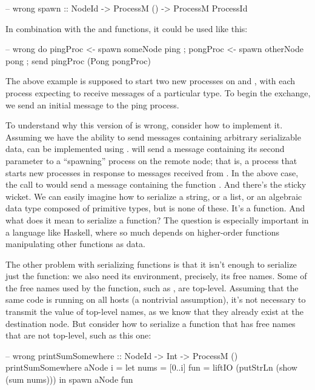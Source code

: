 \documentclass[preprint]{sigplanconf}
\begin{document}
\begin{code}
-- wrong
spawn :: NodeId -> ProcessM () -> ProcessM ProcessId
\end{code}

In combination with the  and  functions, it could be used like this:

\begin{code}
-- wrong
do { pingProc <- spawn someNode ping
   ; pongProc <- spawn otherNode pong
   ; send pingProc (Pong pongProc) }
\end{code}

The above example is supposed to start two new processes on  and , with each process expecting to receive messages of a particular type. To begin the exchange, we send an initial message to the ping process.

To understand why this version of  is wrong, consider how to implement it. Assuming we have the ability to send messages containing arbitrary serializable data,  can be implemented using .   will send a message containing its second parameter to a ``spawning'' process on the remote node; that is, a process that starts new processes in response to messages received from . In the above case, the call to  would send a message containing the function . And there's the sticky wicket. We can easily imagine how to serialize a string, or a list, or an algebraic data type composed of primitive types, but  is none of these. It's a function. And what does it mean to serialize a function? The question is especially important in a language like Haskell, where so much depends on higher-order functions manipulating other functions as data.

The other problem with serializing functions is that it isn't enough to serialize just the function: we also need its environment, precisely, its free names. Some of the free names used by the  function, such as , are top-level. Assuming that the same code is running on all hosts (a nontrivial assumption), it's not necessary to transmit the value of top-level names, as we know that they already exist at the destination node. But consider how to serialize a function that has free names that are not top-level, such as this one:

\begin{code}
-- wrong
printSumSomewhere :: NodeId -> Int -> ProcessM ()
printSumSomewhere aNode i =
  let nums = [0..i]
      fun = liftIO (putStrLn (show (sum nums)))
   in spawn aNode fun
\end{code}
\end{document}
